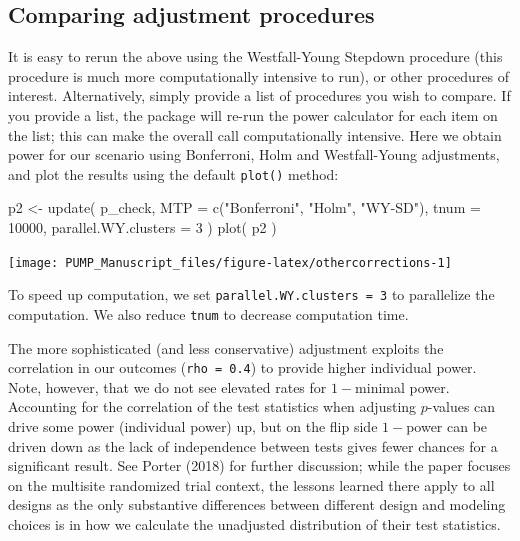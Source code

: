 \documentclass[
]{article}
\newenvironment{Shaded}{\begin{snugshade}}{\end{snugshade}}
\newcommand{\AttributeTok}[1]{\textcolor[rgb]{0.77,0.63,0.00}{#1}}
\newcommand{\DecValTok}[1]{\textcolor[rgb]{0.00,0.00,0.81}{#1}}
\newcommand{\FunctionTok}[1]{\textcolor[rgb]{0.00,0.00,0.00}{#1}}
\newcommand{\NormalTok}[1]{#1}
\newcommand{\OtherTok}[1]{\textcolor[rgb]{0.56,0.35,0.01}{#1}}
\newcommand{\StringTok}[1]{\textcolor[rgb]{0.31,0.60,0.02}{#1}}
\begin{document}
\subsection{Comparing adjustment procedures}

It is easy to rerun the above using the Westfall-Young Stepdown
procedure (this procedure is much more computationally intensive to
run), or other procedures of interest. Alternatively, simply provide a
list of procedures you wish to compare. If you provide a list, the
package will re-run the power calculator for each item on the list; this
can make the overall call computationally intensive. Here we obtain
power for our scenario using Bonferroni, Holm and Westfall-Young
adjustments, and plot the results using the default \texttt{plot()}
method:

\begin{Shaded}
\begin{Highlighting}[]
\NormalTok{p2 }\OtherTok{\textless{}{-}} \FunctionTok{update}\NormalTok{( p\_check,}
              \AttributeTok{MTP =} \FunctionTok{c}\NormalTok{(}\StringTok{"Bonferroni"}\NormalTok{, }\StringTok{"Holm"}\NormalTok{, }\StringTok{"WY{-}SD"}\NormalTok{),}
              \AttributeTok{tnum =} \DecValTok{10000}\NormalTok{,}
              \AttributeTok{parallel.WY.clusters =} \DecValTok{3}\NormalTok{ )}
\FunctionTok{plot}\NormalTok{( p2 )}
\end{Highlighting}
\end{Shaded}

\begin{center}\texttt{[image: PUMP\_Manuscript\_files/figure-latex/othercorrections-1]} \end{center}

To speed up computation, we set \texttt{parallel.WY.clusters\ =\ 3} to
parallelize the computation. We also reduce \texttt{tnum} to decrease
computation time.

The more sophisticated (and less conservative) adjustment exploits the
correlation in our outcomes (\texttt{rho\ =\ 0.4}) to provide higher
individual power. Note, however, that we do not see elevated rates for
\(1-\)minimal power. Accounting for the correlation of the test
statistics when adjusting \(p\)-values can drive some power (individual
power) up, but on the flip side \(1-\)power can be driven down as the
lack of independence between tests gives fewer chances for a significant
result. See Porter (2018) for further discussion; while the paper
focuses on the multisite randomized trial context, the lessons learned
there apply to all designs as the only substantive differences between
different design and modeling choices is in how we calculate the
unadjusted distribution of their test statistics.
\end{document}
